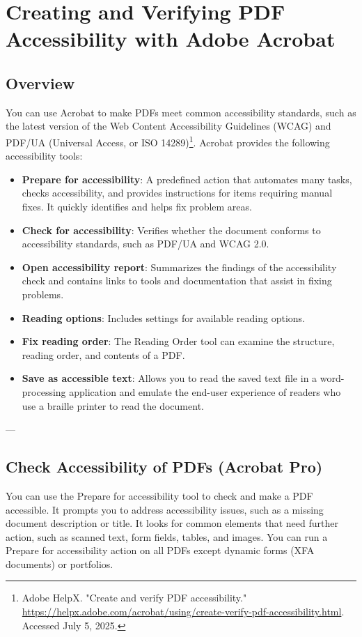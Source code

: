\chapter{Creating and Verifying PDF Accessibility with Adobe Acrobat}
\label{chap:pdf-accessibility-acrobat}

\section*{Overview}
You can use Acrobat to make PDFs meet common accessibility standards, such as the latest version of the Web Content Accessibility Guidelines (WCAG) and PDF/UA (Universal Access, or ISO 14289)\footnote{Adobe HelpX. "Create and verify PDF accessibility." \url{https://helpx.adobe.com/acrobat/using/create-verify-pdf-accessibility.html}. Accessed July 5, 2025.}. Acrobat provides the following accessibility tools:
\begin{itemize}
    \item \textbf{Prepare for accessibility}: A predefined action that automates many tasks, checks accessibility, and provides instructions for items requiring manual fixes. It quickly identifies and helps fix problem areas.
    \item \textbf{Check for accessibility}: Verifies whether the document conforms to accessibility standards, such as PDF/UA and WCAG 2.0.
    \item \textbf{Open accessibility report}: Summarizes the findings of the accessibility check and contains links to tools and documentation that assist in fixing problems.
    \item \textbf{Reading options}: Includes settings for available reading options.
    \item \textbf{Fix reading order}: The Reading Order tool can examine the structure, reading order, and contents of a PDF.
    \item \textbf{Save as accessible text}: Allows you to read the saved text file in a word-processing application and emulate the end-user experience of readers who use a braille printer to read the document.
\end{itemize}

---

\section*{Check Accessibility of PDFs (Acrobat Pro)}
You can use the Prepare for accessibility tool to check and make a PDF accessible. It prompts you to address accessibility issues, such as a missing document description or title. It looks for common elements that need further action, such as scanned text, form fields, tables, and images. You can run a Prepare for accessibility action on all PDFs except dynamic forms (XFA documents) or portfolios\footnotemark[1].

